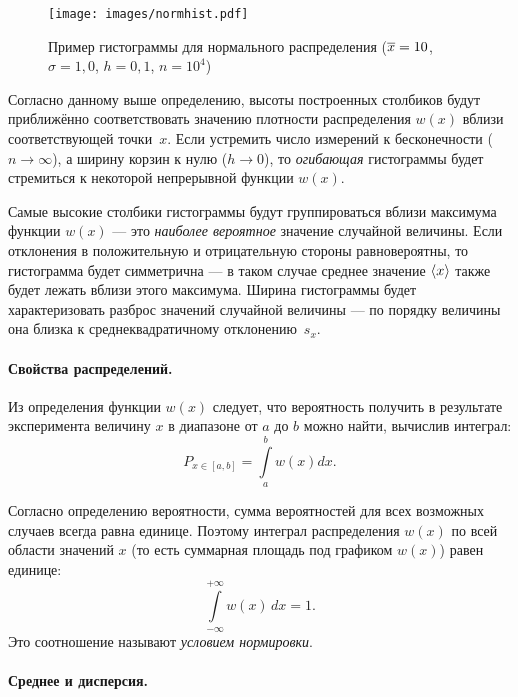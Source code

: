 \begin{figure}[ht!]
    \centering
    \texttt{[image: images/normhist.pdf]}
    \caption{Пример гистограммы для нормального распределения ($\overline{x}=10$,
$\sigma=1{,}0$, $h=0{,}1$, $n=10^{4}$)}\label{fig:normhist}
\end{figure}

Согласно данному выше определению, высоты построенных столбиков будут приближённо соответствовать значению плотности распределения $w(x)$ вблизи соответствующей точки~$x$.
Если устремить число измерений к бесконечности ($n\to \infty$), а ширину корзин
к нулю ($h\to0$), то \emph{огибающая} гистограммы будет стремиться к некоторой
непрерывной функции $w(x)$.

Самые высокие столбики гистограммы будут группироваться вблизи максимума
функции $w(x)$ --- это \emph{наиболее вероятное} значение случайной величины.
Если отклонения в положительную и отрицательную стороны равновероятны,
то гистограмма будет симметрична --- в таком случае среднее значение $\left<x\right>$
также будет лежать вблизи этого максимума. Ширина гистограммы будет характеризовать разброс
значений случайной величины --- по порядку величины
она близка к среднеквадратичному отклонению~$s_x$.

\paragraph{Свойства распределений.}

Из определения функции $w(x)$ следует, что вероятность получить в результате
эксперимента величину $x$ в диапазоне от $a$ до $b$
можно найти, вычислив интеграл:
\begin{equation}
    P_{x\in [a, b]}=\int\limits _{a}^{b}w\!\left(x\right)dx.\label{eq:P}
\end{equation}

Согласно определению вероятности, сумма вероятностей для всех возможных случаев
всегда равна единице. Поэтому интеграл распределения $w(x)$ по всей области
значений $x$ (то есть суммарная площадь под графиком $w(x)$) равен единице:
\[
\int\limits_{-\infty}^{+\infty} w(x)\,dx=1.
\]
Это соотношение называют \emph{условием нормировки}.

\paragraph{Среднее и дисперсия.}

